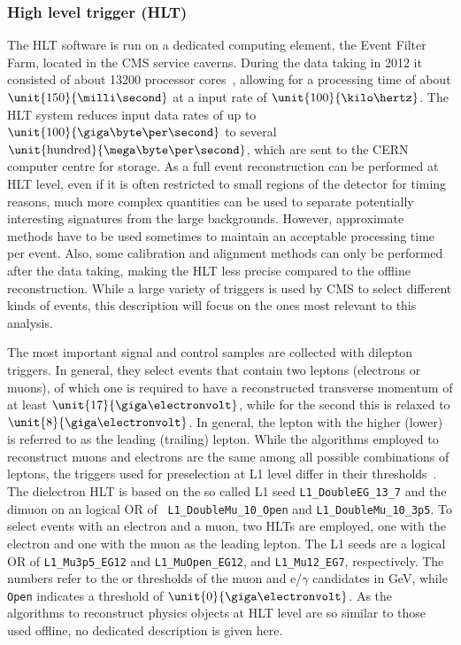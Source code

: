 \subsubsection*{High level trigger (HLT)}
The HLT software is run on a dedicated computing element, the Event Filter Farm, located in the CMS service caverns. During the data taking in 2012 it consisted of about 13200 processor cores~\cite{HLTProceedings}, allowing for a processing time of about $\unit{150}{\milli\second}$ at a input rate of $\unit{100}{\kilo\hertz}$. The HLT system reduces input data rates of up to $\unit{100}{\giga\byte\per\second}$ to several $\unit{\text{hundred}}{\mega\byte\per\second}$, which are sent to the CERN computer centre for storage. As a full event reconstruction can be performed at HLT level, even if it is often restricted to small regions of the detector for timing reasons, much more complex quantities can be used to separate potentially interesting signatures from the large backgrounds. However, approximate methods have to be used sometimes to maintain an acceptable processing time per event. Also, some calibration and alignment methods can only be performed after the data taking, making the HLT less precise compared to the offline reconstruction. While a large variety of triggers is used by CMS to select different kinds of events, this description will focus on the ones most relevant to this analysis. 

The most important signal and control samples are collected with dilepton triggers. In general, they select events that contain two leptons (electrons or muons), of which one is required to have a reconstructed transverse momentum \pt of at least $\unit{17}{\giga\electronvolt}$, while for the second this is relaxed to $\unit{8}{\giga\electronvolt}$. In general, the lepton with the higher (lower) \pt is referred to as the leading (trailing) lepton. While the algorithms employed to reconstruct muons and electrons are the same among all possible combinations of leptons, the triggers used for preselection at L1 level differ in their thresholds~\cite{HLTConfigBrowser}. The dielectron HLT is based on the so called L1 seed \verb+L1_DoubleEG_13_7+ and the dimuon on an logical OR of \verb+	L1_DoubleMu_10_Open+ and \verb+L1_DoubleMu_10_3p5+. To select events with an electron and a muon, two HLTs are employed, one with the electron and one with the muon as the leading lepton. The L1 seeds are a logical OR of \verb+L1_Mu3p5_EG12+ and \verb+L1_MuOpen_EG12+, and \verb+L1_Mu12_EG7+, respectively. The numbers refer to the \pt or \Et thresholds of the muon and e/$\gamma$ candidates in GeV, while \verb+Open+ indicates a threshold of $\unit{0}{\giga\electronvolt}$. As the algorithms to reconstruct physics objects at HLT level are so similar to those used offline, no dedicated description is given here.

